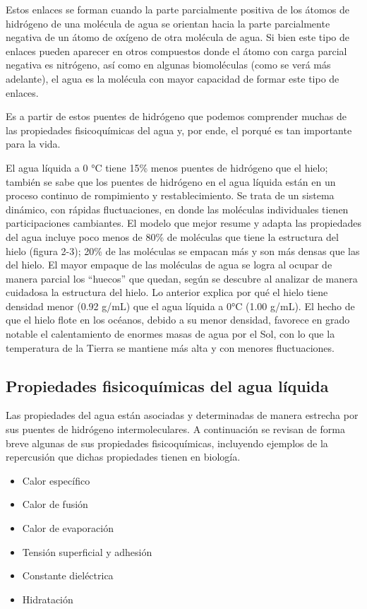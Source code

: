 Estos enlaces se forman cuando la parte parcialmente positiva de los átomos de hidrógeno de una molécula de agua se orientan hacia la parte parcialmente negativa de un átomo de oxígeno de otra molécula de agua. Si bien este tipo de enlaces pueden aparecer en otros compuestos donde el átomo con carga parcial negativa es nitrógeno, así como en algunas biomoléculas (como se verá más adelante), el agua es la molécula con mayor capacidad de formar este tipo de enlaces.

Es a partir de estos puentes de hidrógeno que podemos comprender muchas de las propiedades fisicoquímicas del agua y, por ende, el porqué es tan importante para la vida. 

El agua líquida a 0 °C tiene 15\% menos puentes de hidrógeno que el hielo; también se sabe que los puentes de hidrógeno en el agua líquida están en un proceso continuo de rompimiento y restablecimiento. Se trata de un sistema dinámico, con rápidas fluctuaciones, en donde las moléculas individuales tienen participaciones cambiantes. El modelo que mejor resume y adapta las propiedades del agua incluye poco menos de 80\% de moléculas que tiene la estructura del hielo (figura 2-3); 20\% de las moléculas se empacan más y son más densas que las del hielo. El mayor empaque de las moléculas de agua se logra al ocupar de manera parcial los “huecos” que quedan, según se descubre al analizar de manera cuidadosa la estructura del hielo. Lo anterior explica por qué el hielo tiene densidad menor (0.92 g/mL) que el agua líquida a 0°C (1.00 g/mL). El hecho de que el hielo flote en los océanos, debido a su menor densidad, favorece en grado notable el calentamiento de enormes masas de agua por el Sol, con lo que la temperatura de la Tierra se mantiene más alta y con menores fluctuaciones.

\subsection{Propiedades fisicoquímicas del agua líquida}

Las propiedades del agua están asociadas y determinadas de manera estrecha por sus puentes de hidrógeno intermoleculares. A continuación se revisan de forma breve algunas de sus propiedades fisicoquímicas, incluyendo ejemplos de la repercusión que dichas propiedades tienen en biología.

\begin{itemize}
    \item Calor específico
    \item Calor de fusión
    \item Calor de evaporación
    \item Tensión superficial y adhesión 
    \item Constante dieléctrica
    \item Hidratación
\end{itemize}

